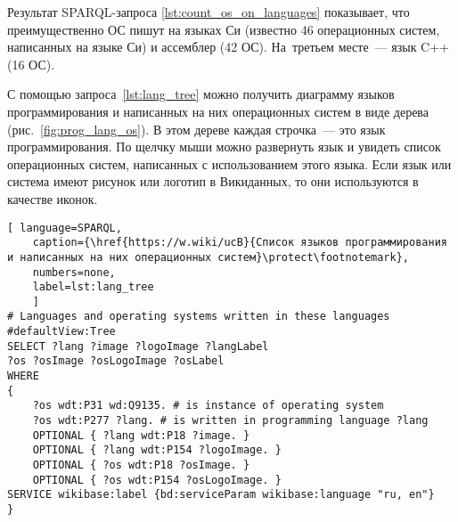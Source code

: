Результат SPARQL-запроса \ref{lst:count_os_on_languages} показывает, 
что преимущественно ОС пишут на языках Си (известно 46 операционных систем, написанных на языке Си) и ассемблер (42 ОС). 
На~третьем месте~--- язык C++ (16 ОС).



С помощью запроса~\ref{lst:lang_tree} можно получить диаграмму языков программирования 
и написанных на них операционных систем в виде дерева (рис.~\ref{fig:prog_lang_os}). 
В этом дереве каждая строчка~--- это язык программирования. 
По щелчку мыши можно развернуть язык и увидеть список операционных систем, 
написанных с использованием этого языка. 
Если язык или система имеют рисунок или логотип в Викиданных, 
то они используются в качестве иконок.
%

\begin{lstlisting}[ language=SPARQL, 
	caption={\href{https://w.wiki/ucB}{Список языков программирования и написанных на них операционных систем}\protect\footnotemark},
    numbers=none,
	label=lst:lang_tree
	]
# Languages and operating systems written in these languages
#defaultView:Tree
SELECT ?lang ?image ?logoImage ?langLabel 
?os ?osImage ?osLogoImage ?osLabel 
WHERE 
{
	?os wdt:P31 wd:Q9135. # is instance of operating system
	?os wdt:P277 ?lang. # is written in programming language ?lang
	OPTIONAL { ?lang wdt:P18 ?image. }
	OPTIONAL { ?lang wdt:P154 ?logoImage. }
	OPTIONAL { ?os wdt:P18 ?osImage. }
	OPTIONAL { ?os wdt:P154 ?osLogoImage. }
SERVICE wikibase:label {bd:serviceParam wikibase:language "ru, en"}
}
\end{lstlisting}
%








